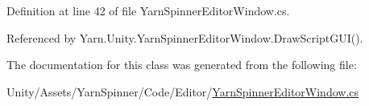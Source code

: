 Definition at line 42 of file Yarn\-Spinner\-Editor\-Window.\-cs.



Referenced by Yarn.\-Unity.\-Yarn\-Spinner\-Editor\-Window.\-Draw\-Script\-G\-U\-I().



The documentation for this class was generated from the following file\-:\begin{DoxyCompactItemize}
\item 
Unity/\-Assets/\-Yarn\-Spinner/\-Code/\-Editor/\hyperlink{a00293}{Yarn\-Spinner\-Editor\-Window.\-cs}\end{DoxyCompactItemize}
